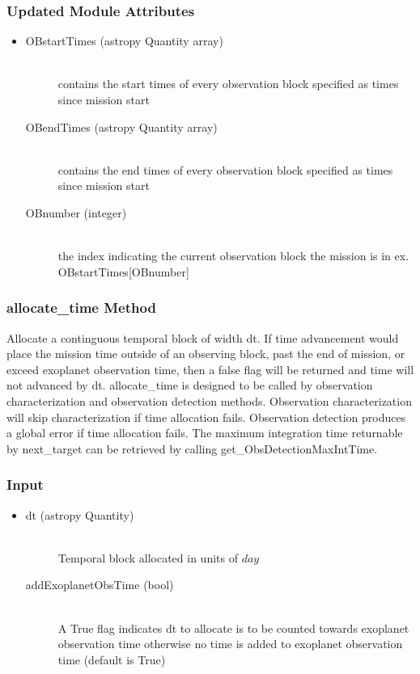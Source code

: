 \documentclass[cleanfoot]{asme2ej}
\begin{document}
\subsubsection*{Updated Module Attributes}
\begin{itemize}
\item 
\begin{description}
    \item[OBstartTimes (astropy Quantity array)] \hfill \\ contains the start times of every observation block specified as times since mission start
    \item[OBendTimes (astropy Quantity array)] \hfill \\ contains the end times of every observation block specified as times since mission start
    \item[OBnumber (integer)] \hfill \\ the index indicating the current observation block the mission is in ex. OBstartTimes[OBnumber]
\end{description}
\end{itemize}

\subsubsection{allocate\_time Method} \label{sec:allocatetimetask}
Allocate a continguous temporal block of width dt. If time advancement would place the mission time outside of an observing block, past the end of mission, or exceed exoplanet observation time, then a false flag will be returned and time will not advanced by dt. allocate\_time is designed to be called by observation characterization and observation detection methods. Observation characterization will skip characterization if time allocation fails. Observation detection produces a global error if time allocation fails. The maximum integration time returnable by next\_target can be retrieved by calling get\_ObsDetectionMaxIntTime.
\subsubsection*{Input}
\begin{itemize}
\item 
\begin{description}
    \item[dt (astropy Quantity)] \hfill \\ Temporal block allocated in units of $ day $
    \item[addExoplanetObsTime (bool)] \hfill \\ A True flag indicates dt to allocate is to be counted towards exoplanet observation time otherwise no time is added to exoplanet observation time (default is True)
\end{description}
\end{itemize}
\end{document}
